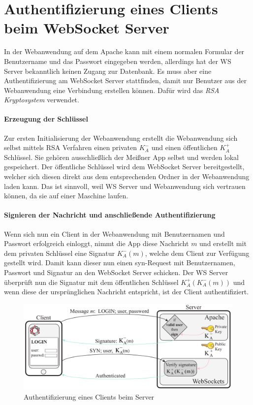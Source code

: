 \section{Authentifizierung eines Clients beim WebSocket Server}
In der Webanwendung auf dem Apache kann mit einem normalen Formular der Benutzername und das Passwort eingegeben werden, allerdings hat der WS Server bekanntlich keinen Zugang zur Datenbank. Es muss aber eine Authentifizierung am WebSocket Server stattfinden, damit nur Benutzer aus der Webanwendung eine Verbindung erstellen können. Dafür wird das \emph{RSA Kryptosystem} verwendet.

\paragraph{Erzeugung der Schlüssel}
Zur ersten Initialisierung der Webanwendung erstellt die Webanwendung sich selbst mittels RSA Verfahren einen privaten $K^-_A$ und einen öffentlichen $K^+_A$ Schlüssel. Sie gehören ausschließlich der Meißner App selbst und werden lokal gespeichert. Der öffentliche Schlüssel wird dem WebSocket Server bereitgestellt, welcher sich diesen direkt aus dem entsprechenden Ordner in der Webanwendung laden kann. Das ist sinnvoll, weil WS Server und Webanwendung sich vertrauen können, da sie auf einer Maschine laufen.

\paragraph{Signieren der Nachricht und anschließende Authentifizierung}
Wenn sich nun ein Client in der Webanwendung mit Benutzernamen und Passwort erfolgreich einloggt, nimmt die App diese Nachricht $m$ und erstellt mit dem privaten Schlüssel eine Signatur $K^-_A(m)$, welche dem Client zur Verfügung gestellt wird. Damit kann dieser nun einen syn-Request mit Benutzernamen, Passwort und Signatur an den WebSocket Server schicken. Der WS Server überprüft nun die Signatur mit dem öffentlichen Schlüssel $K^+_A(K^-_A(m))$ und wenn diese der ursprünglichen Nachricht entspricht, ist der Client authentifiziert.

\begin{figure}[!ht]
	\centering
	\includegraphics[width=15cm]{fig/publicprivate}
	\caption{Authentifizierung eines Clients beim Server}
\end{figure}

